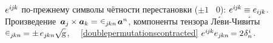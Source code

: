 \begin{otherlanguage}{russian}
\vspace{-0.2em}\noindent
{}
${e^{i\hspace{-0.1ex}j\hspace{-0.1ex}k}}$ по\hbox{-}прежнему символы чётности перестановки (${\pm 1}$ ~$0$):
${e^{i\hspace{-0.1ex}j\hspace{-0.1ex}k} \hspace{-0.1ex} \equiv e_{i\hspace{-0.1ex}j\hspace{-0.1ex}k}}$.
Произведение~${\bm{a}_j \hspace{-0.1ex} \times \bm{a}_k = \hspace{.1ex} \permutationsparitysymbols{j\hspace{-0.1ex}kn} \hspace{.2ex} \bm{a}^n\hspace{-0.12ex}}$,
компоненты тензора Л\'{е}ви\hbox{-\!}Чив\'{и}ты~${ \permutationsparitysymbols{j\hspace{-0.1ex}kn} \hspace{-0.2ex} = \pm \hspace{.33ex} e_{j\hspace{-0.1ex}kn} \hspace{-0.1ex} \sqrt{\hspace{-0.36ex}\mathstrut{\textsl{g}}} }$,
~~\eqref{doublepermutationscontracted}
${e^{i\hspace{-0.1ex}j\hspace{-0.1ex}k} e_{j\hspace{-0.1ex}kn} \hspace{-0.25ex} = 2 \hspace{.1ex} \delta_n^{\hspace{.1ex}i}}$.


\end{otherlanguage}
